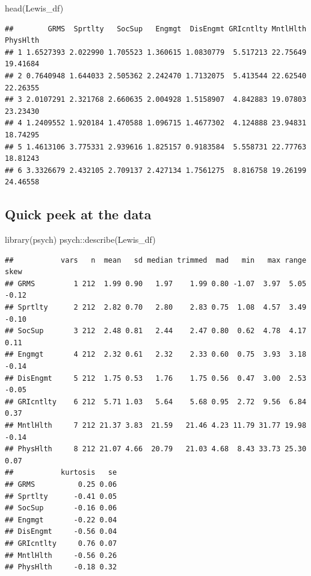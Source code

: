 \documentclass[
  english,
]{book}
\newenvironment{Shaded}{\begin{snugshade}}{\end{snugshade}}
\newcommand{\FunctionTok}[1]{\textcolor[rgb]{0.00,0.00,0.00}{#1}}
\newcommand{\NormalTok}[1]{#1}
\newcommand{\SpecialCharTok}[1]{\textcolor[rgb]{0.00,0.00,0.00}{#1}}
\begin{document}
\begin{Shaded}
\begin{Highlighting}[]
\FunctionTok{head}\NormalTok{(Lewis\_df)}
\end{Highlighting}
\end{Shaded}

\begin{verbatim}
##        GRMS  Sprtlty   SocSup   Engmgt  DisEngmt GRIcntlty MntlHlth PhysHlth
## 1 1.6527393 2.022990 1.705523 1.360615 1.0830779  5.517213 22.75649 19.41684
## 2 0.7640948 1.644033 2.505362 2.242470 1.7132075  5.413544 22.62540 22.26355
## 3 2.0107291 2.321768 2.660635 2.004928 1.5158907  4.842883 19.07803 23.23430
## 4 1.2409552 1.920184 1.470588 1.096715 1.4677302  4.124888 23.94831 18.74295
## 5 1.4613106 3.775331 2.939616 1.825157 0.9183584  5.558731 22.77763 18.81243
## 6 3.3326679 2.432105 2.709137 2.427134 1.7561275  8.816758 19.26199 24.46558
\end{verbatim}

\hypertarget{quick-peek-at-the-data}{%
\subsection{Quick peek at the data}\label{quick-peek-at-the-data}}

\begin{Shaded}
\begin{Highlighting}[]
\FunctionTok{library}\NormalTok{(psych)}
\NormalTok{psych}\SpecialCharTok{::}\FunctionTok{describe}\NormalTok{(Lewis\_df)}
\end{Highlighting}
\end{Shaded}

\begin{verbatim}
##           vars   n  mean   sd median trimmed  mad   min   max range  skew
## GRMS         1 212  1.99 0.90   1.97    1.99 0.80 -1.07  3.97  5.05 -0.12
## Sprtlty      2 212  2.82 0.70   2.80    2.83 0.75  1.08  4.57  3.49 -0.10
## SocSup       3 212  2.48 0.81   2.44    2.47 0.80  0.62  4.78  4.17  0.11
## Engmgt       4 212  2.32 0.61   2.32    2.33 0.60  0.75  3.93  3.18 -0.14
## DisEngmt     5 212  1.75 0.53   1.76    1.75 0.56  0.47  3.00  2.53 -0.05
## GRIcntlty    6 212  5.71 1.03   5.64    5.68 0.95  2.72  9.56  6.84  0.37
## MntlHlth     7 212 21.37 3.83  21.59   21.46 4.23 11.79 31.77 19.98 -0.14
## PhysHlth     8 212 21.07 4.66  20.79   21.03 4.68  8.43 33.73 25.30  0.07
##           kurtosis   se
## GRMS          0.25 0.06
## Sprtlty      -0.41 0.05
## SocSup       -0.16 0.06
## Engmgt       -0.22 0.04
## DisEngmt     -0.56 0.04
## GRIcntlty     0.76 0.07
## MntlHlth     -0.56 0.26
## PhysHlth     -0.18 0.32
\end{verbatim}
\end{document}
